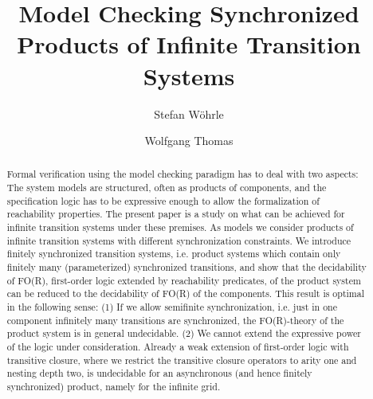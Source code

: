 \documentclass{LMCS}
\begin{document}
\title[Model Checking Synchronized Products]{Model Checking 
Synchronized Products of Infinite Transition Systems\rsuper *}

\author[S. W\"ohrle]{Stefan W\"ohrle}	\address{Informatik 7, RWTH Aachen, 52056 Aachen, Germany}

\author[w.~Thomas]{Wolfgang Thomas}	\address{ pt}	




\begin{abstract}
  \noindent 
Formal verification using the model checking paradigm
has to deal with two aspects: The system models are structured,
often as products of components, and the specification logic has to be expressive
enough to allow the formalization of reachability properties. The present 
paper is a study on what can be achieved for infinite transition systems 
under these premises. As models we  consider products of infinite transition 
systems with different synchronization constraints. We introduce
finitely synchronized transition systems,  i.e. product systems which contain 
only finitely many (parameterized) synchronized transitions, and show that the decidability of 
FO(R), first-order logic extended by reachability predicates, of the product 
system can be reduced to the decidability of FO(R) of the components.
This result is optimal in the following sense: (1) If we allow  semifinite synchronization, i.e. just in one component infinitely many 
transitions are synchronized, the FO(R)-theory of the product system is in general 
undecidable. (2) We cannot extend the expressive power of the logic 
under consideration. Already a weak extension of first-order logic with transitive 
closure, where we restrict the transitive closure operators to arity one and 
nesting depth two, is undecidable for an asynchronous (and hence finitely synchronized) 
product, namely for the infinite grid. 
\end{abstract}

\maketitle
\end{document}
